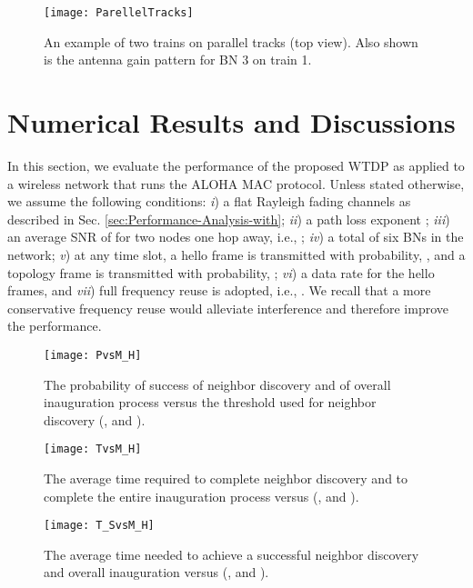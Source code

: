 \documentclass[10pt,english,two column]{IEEEtran}
\begin{document}
\begin{figure}[htbp]
\begin{centering}
\textsf{\texttt{[image: ParellelTracks]}}
\par\end{centering}

\caption{\label{fig:parellel tracks} An example of two trains on parallel
tracks (top view). Also shown is the antenna gain pattern for BN 3
on train 1.}
\end{figure}



\section{Numerical Results and Discussions\label{sec:Numerical-Results-and}}

In this section, we evaluate the performance of the proposed WTDP
as applied to a wireless network that runs the ALOHA MAC protocol.
Unless stated otherwise, we assume the following conditions: \textit{i})
a flat Rayleigh fading channels as described in Sec. \ref{sec:Performance-Analysis-with};
\textit{ii}) a path loss exponent ; \textit{iii}) an average
SNR of  for two nodes one hop away, i.e., ;
\textit{iv}) a total of six BNs in the network; \textit{v}) at any
time slot, a hello frame is transmitted with probability, ,
and a topology frame is transmitted with probability, ;
\textit{vi}) a data rate   for the
hello frames, and \textit{vii}) full frequency reuse is adopted, i.e.,
. We recall that a more conservative frequency reuse would alleviate
interference and therefore improve the performance. 
\begin{figure}[h]
\begin{centering}
\textsf{\texttt{[image: PvsM\_H]}}
\par\end{centering}

\caption{\label{fig: PvsM_H}The probability of success of neighbor discovery
and of overall inauguration process versus the threshold 
used for neighbor discovery (,  and ).}
\end{figure}
\begin{figure}[h]
\begin{centering}
\textsf{\texttt{[image: TvsM\_H]}}
\par\end{centering}

\caption{\label{fig: TvsM_H}The average time required to complete neighbor
discovery and to complete the entire inauguration process versus 
(,  and ).}
\end{figure}
\begin{figure}[h]
\begin{centering}
\textsf{\texttt{[image: T\_SvsM\_H]}}
\par\end{centering}

\caption{\label{fig: T_SvsM_H}The average time needed to achieve a successful
neighbor discovery and overall inauguration versus  (,
 and ).}
\end{figure}
\end{document}
